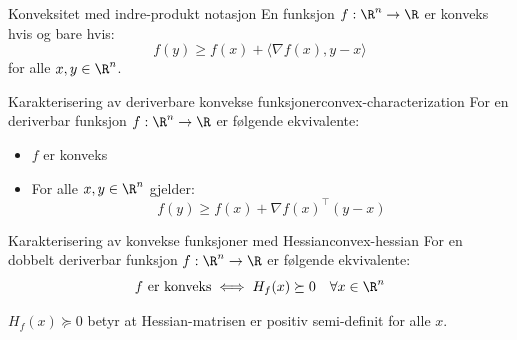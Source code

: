 \begin{remark}{Konveksitet med indre-produkt notasjon}{}
	En funksjon  \(f: \R^n \to \R\) er konveks hvis og bare hvis:
	\[
		f(y) \geq f(x) + \langle \nabla f(x), y - x \rangle
	\]
	for alle  \(x, y \in \R^n\).
\end{remark}

\begin{theorem}{Karakterisering av deriverbare konvekse funksjoner}{convex-characterization}
	For en deriverbar funksjon  \(f: \R^n \to \R\) er følgende ekvivalente:
	\begin{itemize}
		\item  \(f\) er konveks
		\item For alle  \(x, y \in \R^n\) gjelder:
		      \[
			      f(y) \geq f(x) + \nabla f(x)^\top (y - x)
		      \]
	\end{itemize}
\end{theorem}

\begin{theorem}{Karakterisering av konvekse funksjoner med Hessian}{convex-hessian}
	For en dobbelt deriverbar funksjon  \(f: \R^n \to \R\) er følgende ekvivalente:
	\[
		f \text{ er konveks} \iff H_f(x) \succeq 0 \quad \forall x \in \R^n
	\]

	\(H_f(x) \succeq 0\) betyr at Hessian-matrisen er positiv semi-definit for alle  \(x\).

\end{theorem}

